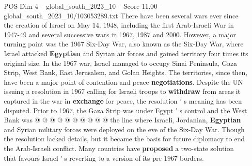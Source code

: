 \begin{textsample}{POS Dim 4 – global\_south\_2023\_10 – Score 11.00 – global\_south\_2023\_10/103053289.txt}
There have been several wars ever since the creation of Israel on May 14, 1948, including the first Arab-Israeli War in 1947-49 and several successive wars in 1967, 1987 and 2000.
However, a major turning point was the 1967 Six-Day War, also known as the Six-Day War, where Israel attacked \textbf{Egyptian} and Syrian air forces and gained territory four times its original size.
In the 1967 war, Israel managed to occupy Sinai Peninsula, Gaza Strip, West Bank, East Jerusalem, and Golan Heights.
The territories, since then, have been a major point of contention and peace \textbf{negotiations}.
Despite the UN issuing a resolution in 1967 calling for Israeli troops to \textbf{withdraw} from areas it captured in the war in \textbf{exchange} for peace, the resolution ' s meaning has been disputed.
Prior to 1967, the Gaza Strip was under Egypt ' s control and the West Bank was @ @ @ @ @ @ @ @ @ @ the line where Israeli, Jordanian, \textbf{Egyptian} and Syrian military forces were deployed on the eve of the Six-Day War.
Though the resolution lacked details, but it became the basis for future diplomacy to end the Arab-Israeli conflict.
Many countries have \textbf{proposed} a two-state solution that favours Israel ' s reverting to a version of its pre-1967 borders.

\end{textsample}
